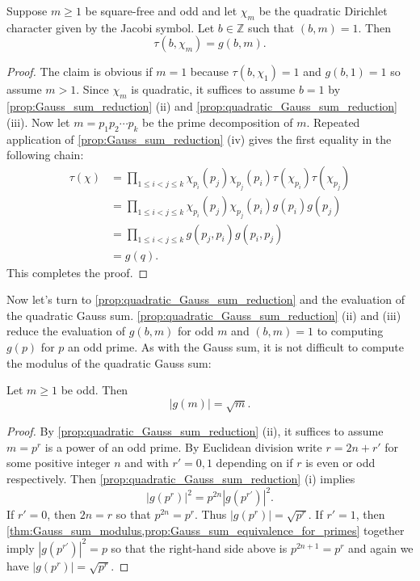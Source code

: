       \begin{theorem}
        Suppose $m \ge 1$ be square-free and odd and let $\chi_{m}$ be the quadratic Dirichlet character given by the Jacobi symbol. Let $b \in \mathbb{Z}$ such that $(b,m) = 1$. Then
        \[
          \tau(b,\chi_{m}) = g(b,m).
        \]
      \end{theorem}
      \begin{proof}
        The claim is obvious if $m = 1$ because $\tau(b,\chi_{1}) = 1$ and $g(b,1) = 1$ so assume $m > 1$. Since $\chi_{m}$ is quadratic, it suffices to assume $b = 1$ by \cref{prop:Gauss_sum_reduction} (ii) and \cref{prop:quadratic_Gauss_sum_reduction} (iii). Now let $m = p_{1}p_{2} \cdots p_{k}$ be the prime decomposition of $m$. Repeated application of \cref{prop:Gauss_sum_reduction} (iv) gives the first equality in the following chain:
        \begin{align*}
          \tau(\chi) &= \prod_{1 \le i < j \le k}\chi_{p_{i}}(p_{j})\chi_{p_{j}}(p_{i})\tau(\chi_{p_{i}})\tau(\chi_{p_{j}}) \\
          &= \prod_{1 \le i < j \le k}\chi_{p_{i}}(p_{j})\chi_{p_{j}}(p_{i})g(p_{i})g(p_{j}) \\
          &= \prod_{1 \le i < j \le k}g(p_{j},p_{i})g(p_{i},p_{j}) \\
          &= g(q).
        \end{align*}
        This completes the proof.
      \end{proof}

      Now let's turn to \cref{prop:quadratic_Gauss_sum_reduction} and the evaluation of the quadratic Gauss sum. \cref{prop:quadratic_Gauss_sum_reduction} (ii) and (iii) reduce the evaluation of $g(b,m)$ for odd $m$ and $(b,m) = 1$ to computing $g(p)$ for $p$ an odd prime. As with the Gauss sum, it is not difficult to compute the modulus of the quadratic Gauss sum:

      \begin{theorem}\label{thm:quadratic_Gauss_sum_modulus}
        Let $m \ge 1$ be odd. Then
        \[
          |g(m)| = \sqrt{m}.
        \]
      \end{theorem}
      \begin{proof}
        By \cref{prop:quadratic_Gauss_sum_reduction} (ii), it suffices to assume $m = p^{r}$ is a power of an odd prime. By Euclidean division write $r = 2n+r'$ for some positive integer $n$ and with $r' = 0,1$ depending on if $r$ is even or odd respectively. Then \cref{prop:quadratic_Gauss_sum_reduction} (i) implies
        \[
          |g(p^{r})|^{2} = p^{2n}|g(p^{r'})|^{2}.
        \]
        If $r' = 0$, then $2n = r$ so that $p^{2n} = p^{r}$. Thus $|g(p^{r})| = \sqrt{p^{r}}$. If $r' = 1$, then \cref{thm:Gauss_sum_modulus,prop:Gauss_sum_equivalence_for_primes} together imply $|g(p^{r'})|^{2} = p$ so that the right-hand side above is $p^{2n+1} = p^{r}$ and again we have $|g(p^{r})| = \sqrt{p^{r}}$.
      \end{proof}

